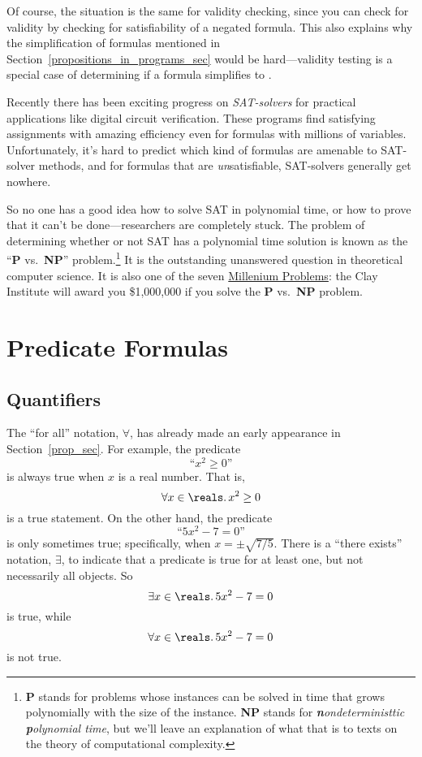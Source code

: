 Of course, the situation is the same for validity%
checking, since you can check for validity by checking
 for satisfiability of a negated
formula.  This also explains why the simplification of formulas
mentioned in Section~\ref{propositions_in_programs_sec} would be
hard---validity testing is a special case of determining if a formula
simplifies to \true.

Recently there has been exciting progress on \emph{SAT-solvers}%
for practical applications like digital circuit verification.  These
programs find satisfying assignments with amazing efficiency even for
formulas with millions of variables.  Unfortunately, it's hard to
predict which kind of formulas are amenable to SAT-solver methods, and
for formulas that are \emph{un}satisfiable, SAT-solvers generally get
nowhere.

So no one has a good idea how to solve SAT in polynomial time, or how
to prove that it can't be done---researchers are completely stuck.
The problem of determining whether or not SAT has a polynomial time
solution is known as the ``\textbf{P} vs.\ \textbf{NP}''%
problem.\footnote{\textbf{P} stands for problems whose instances can
  be solved in time that grows polynomially with the size of the
  instance.  \textbf{NP} stands for \emph{\textbf{n}ondeterministtic \textbf{p}olynomial time},
  but we'll leave an explanation of what that is to texts on the
  theory of computational complexity.}  It is the outstanding
unanswered question in theoretical computer science.  It is also one
of the seven \href{http://www.claymath.org/millennium/}{Millenium
  Problems}: the Clay Institute will award you \$1,000,000 if you
solve the \textbf{P} vs.\ \textbf{NP} problem.

\begin{problems}

\homeworkproblems
{}

\end{problems}

\section{Predicate Formulas}\label{predicate_sec}

\subsection{Quantifiers}\label{quantifier_sec}
The ``for all'' notation, $\forall$, has already made an early
appearance in Section~\ref{prop_sec}.  For example, the predicate
\[
\text{``$x^2 \geq 0$''}
\]
is always true when $x$ is a real number.  That is,
\[
\forall x \in \reals.\, x^2 \geq 0
\]
is a true statement.  On the other hand, the predicate
\[
\text{``$5x^2 - 7 = 0$''}
\]
is only sometimes true; specifically, when $x = \pm \sqrt{7/5}$.
There is a ``there exists'' notation, $\exists$, to indicate that a
predicate is true for at least one, but not necessarily all objects.
So 
\[
\exists x \in \reals.\, 5x^2 - 7 = 0
\]
is true, while
\[
\forall x \in \reals.\, 5x^2 - 7 = 0
\]
is not true.


